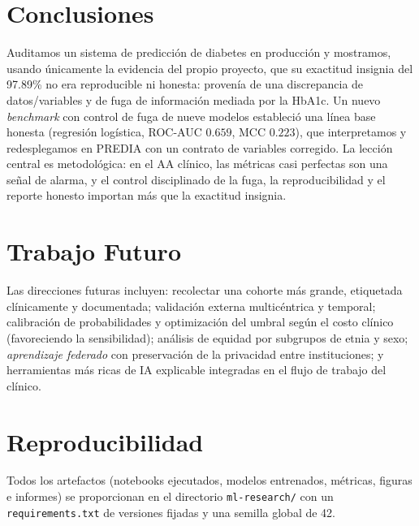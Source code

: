 \documentclass[conference]{IEEEtran}
\begin{document}
\section{Conclusiones}
Auditamos un sistema de predicción de diabetes en producción y mostramos, usando
únicamente la evidencia del propio proyecto, que su exactitud insignia del
97.89\% no era reproducible ni honesta: provenía de una discrepancia de
datos/variables y de fuga de información mediada por la HbA1c. Un nuevo
\emph{benchmark} con control de fuga de nueve modelos estableció una línea base
honesta (regresión logística, ROC-AUC $0.659$, MCC $0.223$), que interpretamos y
redesplegamos en PREDIA con un contrato de variables corregido. La lección
central es metodológica: en el AA clínico, las métricas casi perfectas son una
señal de alarma, y el control disciplinado de la fuga, la reproducibilidad y el
reporte honesto importan más que la exactitud insignia.

\section{Trabajo Futuro}
Las direcciones futuras incluyen: recolectar una cohorte más grande, etiquetada
clínicamente y documentada; validación externa multicéntrica y temporal;
calibración de probabilidades y optimización del umbral según el costo clínico
(favoreciendo la sensibilidad); análisis de equidad por subgrupos de etnia y
sexo; \emph{aprendizaje federado} con preservación de la privacidad entre
instituciones; y herramientas más ricas de IA explicable integradas en el flujo
de trabajo del clínico.

\section*{Reproducibilidad}
Todos los artefactos (notebooks ejecutados, modelos entrenados, métricas,
figuras e informes) se proporcionan en el directorio \texttt{ml-research/} con un
\texttt{requirements.txt} de versiones fijadas y una semilla global de 42.



\end{document}
